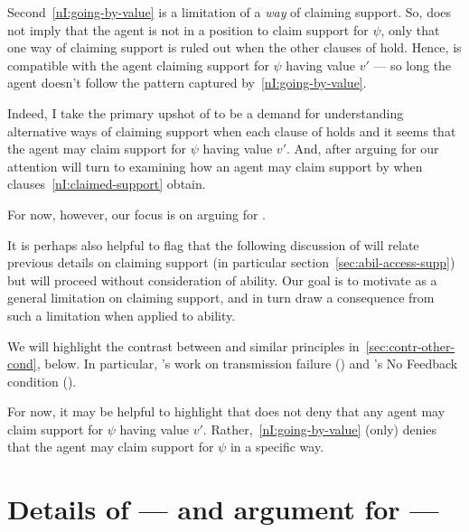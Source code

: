 \begin{note}
  Second~\ref{nI:going-by-value} is a limitation of a \emph{way} of claiming support.
  So, \nI{} does not imply that the agent is not in a position to claim support for \(\psi\), only that one way of claiming support is ruled out when the other clauses of \nI{} hold.
  Hence, \nI{} is compatible with the agent claiming support for \(\psi\) having value \(v'\) --- so long the agent doesn't follow the pattern captured by~\ref{nI:going-by-value}.

  Indeed, I take the primary upshot of \nI{} to be a demand for understanding alternative ways of claiming support when each clause of \nI{} holds and it seems that the agent may claim support for \(\psi\) having value \(v'\).
  And, after arguing for \nI{} our attention will turn to examining how an agent may claim support by \EAS{} when clauses~\ref{nI:claimed-support} obtain.

  For now, however, our focus is on arguing for \nI{}.

  It is perhaps also helpful to flag that the following discussion of \nI{} will relate previous details on claiming support (in particular section~\ref{sec:abil-access-supp}) but will proceed without consideration of ability.
  Our goal is to motivate \nI{} as a general limitation on claiming support, and in turn draw a consequence from such a limitation when applied to ability.
\end{note}

\begin{note}[Literature]
  We will highlight the contrast between \nI{} and similar principles in~\autoref{sec:contr-other-cond}, below.
  In particular, \citeauthor{Wright:2011wn}'s work on transmission failure (\Citeyear{Wright:2003aa,Wright:2011wn}) and \citeauthor{Weisberg:2010to}'s No Feedback condition (\Citeyear{Weisberg:2010to}).

  For now, it may be helpful to highlight that \nI{} does not deny that any agent may claim support for \(\psi\) having value \(v'\).
  Rather,~\ref{nI:going-by-value} (only) denies that the agent may claim support for \(\psi\) in a specific way.
\end{note}

\newpage

\section{Details of --- and argument for --- \nI{}}
\label{sec:details-ni}
\label{sec:re-do-ni}

